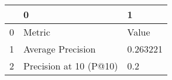 \begin{tabular}{lll}
\toprule
{} &                       0 &         1 \\
\midrule
0 &                  Metric &     Value \\
1 &       Average Precision &  0.263221 \\
2 &  Precision at 10 (P@10) &       0.2 \\
\bottomrule
\end{tabular}
